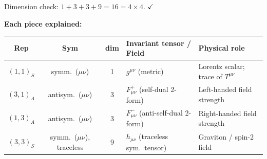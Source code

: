 Dimension check: $1 + 3 + 3 + 9 = 16 = 4\times 4$. $\checkmark$

\medskip
\noindent\textbf{Each piece explained:}

\begin{center}
\renewcommand{\arraystretch}{1.5}
\begin{tabular}{@{}cccll@{}}
  \toprule
  Rep & Sym & dim & Invariant tensor / Field & Physical role \\
  \midrule
  $(1,1)_S$ & symm.\ ($\mu\nu$) & 1
    & $g^{\mu\nu}$ (metric) & Lorentz scalar; trace of $T^{\mu\nu}$ \\
  $(3,1)_A$ & antisym.\ ($\mu\nu$) & 3
    & $F^+_{\mu\nu}$ (self-dual 2-form) & Left-handed field strength \\
  $(1,3)_A$ & antisym.\ ($\mu\nu$) & 3
    & $F^-_{\mu\nu}$ (anti-self-dual 2-form) & Right-handed field strength \\
  $(3,3)_S$ & symm.\ ($\mu\nu$), traceless & 9
    & $h_{\mu\nu}$ (traceless sym.\ tensor) & Graviton / spin-2 field \\
  \bottomrule
\end{tabular}
\end{center}

